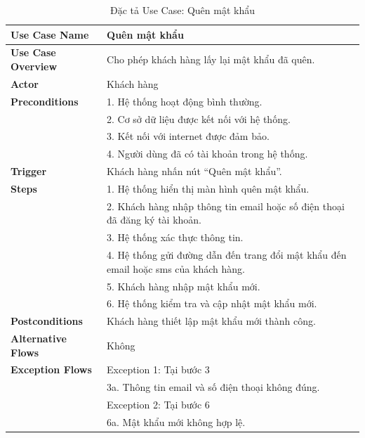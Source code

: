 {\begin{longtable}{|>{\bfseries}p{4cm}|p{11.5cm}|}
\caption{Đặc tả Use Case: Quên mật khẩu}
\label{tab:uc-forgot-password} \\
\hline
\textbf{Use Case Name} & Quên mật khẩu \\
\hline
\textbf{Use Case Overview} & Cho phép khách hàng lấy lại mật khẩu đã quên. \\
\hline
\textbf{Actor} & Khách hàng\\
\hline
\textbf{Preconditions} & 1. Hệ thống hoạt động bình thường. \\
& 2. Cơ sở dữ liệu được kết nối với hệ thống. \\
& 3. Kết nối với internet được đảm bảo. \\
& 4. Người dùng đã có tài khoản trong hệ thống. \\
\hline
\textbf{Trigger} & Khách hàng nhấn nút “Quên mật khẩu”. \\
\hline
\textbf{Steps} & 1. Hệ thống hiển thị màn hình quên mật khẩu. \\
& 2. Khách hàng nhập thông tin email hoặc số điện thoại đã đăng ký tài khoản. \\
& 3. Hệ thống xác thực thông tin. \\
& 4. Hệ thống gửi đường dẫn đến trang đổi mật khẩu đến email hoặc sms của khách hàng. \\
& 5. Khách hàng nhập mật khẩu mới. \\
& 6. Hệ thống kiểm tra và cập nhật mật khẩu mới. \\
\hline
\textbf{Postconditions} & Khách hàng thiết lập mật khẩu mới thành công. \\
\hline
\textbf{Alternative Flows} & Không \\
\hline
\textbf{Exception Flows} & Exception 1: Tại bước 3 \\
& 3a. Thông tin email và số điện thoại không đúng. \\
& Exception 2: Tại bước 6 \\
& 6a. Mật khẩu mới không hợp lệ. \\
\hline
\end{longtable}

}

